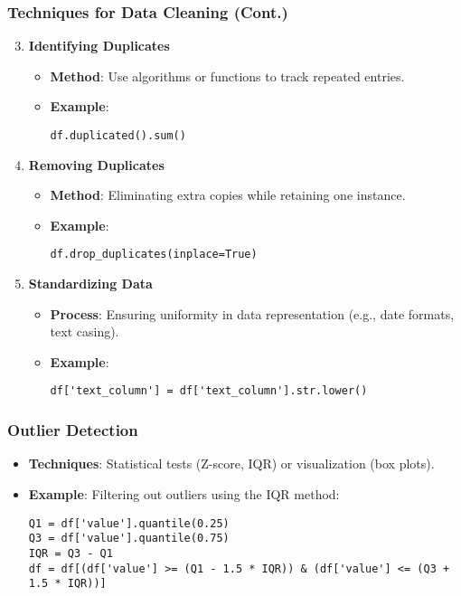 \documentclass{beamer}
\begin{document}
\begin{frame}[fragile]
    \frametitle{Techniques for Data Cleaning (Cont.)}
    \begin{enumerate}
        \setcounter{enumi}{2}
        \item \textbf{Identifying Duplicates}
        \begin{itemize}
            \item \textbf{Method}: Use algorithms or functions to track repeated entries.
            \item \textbf{Example}:
                \begin{lstlisting}
df.duplicated().sum()
                \end{lstlisting}
        \end{itemize}

        \item \textbf{Removing Duplicates}
        \begin{itemize}
            \item \textbf{Method}: Eliminating extra copies while retaining one instance.
            \item \textbf{Example}:
                \begin{lstlisting}
df.drop_duplicates(inplace=True)
                \end{lstlisting}
        \end{itemize}
        
        \item \textbf{Standardizing Data}
        \begin{itemize}
            \item \textbf{Process}: Ensuring uniformity in data representation (e.g., date formats, text casing).
            \item \textbf{Example}:
                \begin{lstlisting}
df['text_column'] = df['text_column'].str.lower()
                \end{lstlisting}
        \end{itemize}
    \end{enumerate}
\end{frame}

\begin{frame}[fragile]
    \frametitle{Outlier Detection}
    \begin{itemize}
        \item \textbf{Techniques}: Statistical tests (Z-score, IQR) or visualization (box plots).
        \item \textbf{Example}: Filtering out outliers using the IQR method:
        \begin{lstlisting}
Q1 = df['value'].quantile(0.25)
Q3 = df['value'].quantile(0.75)
IQR = Q3 - Q1
df = df[(df['value'] >= (Q1 - 1.5 * IQR)) & (df['value'] <= (Q3 + 1.5 * IQR))]
        \end{lstlisting}
    \end{itemize}
\end{frame}
\end{document}
